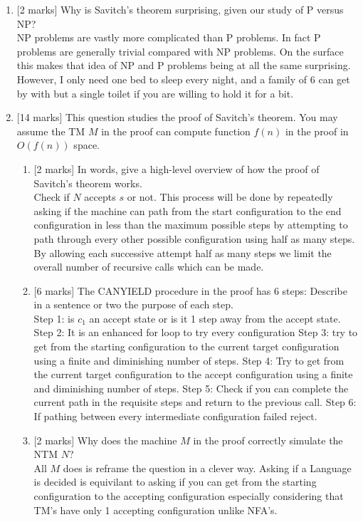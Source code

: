 \documentclass{article}
\begin{document}
\begin{enumerate}
            \item {[2 marks]} Why is Savitch's theorem surprising, given our study of P versus NP? \\
NP problems are vastly more complicated than P problems. In fact P problems are generally trivial compared with NP problems. On the surface this makes that idea of NP and P problems being at all the same surprising. However, I only need one bed to sleep every night, and a family of 6 can get by with but a single toilet if you are willing to hold it for a bit. 

            \item {[14 marks]} This question studies the proof of Savitch's theorem. You may assume the TM $M$ in the proof can compute function $f(n)$ in the proof in $O(f(n))$ space.
            \begin{enumerate}
                \item {[2 marks]} In words, give a high-level overview of how the proof of Savitch's theorem works.\\
                
Check if $N$ accepts $s$ or not. This process will be done by repeatedly asking if the machine can path from the start configuration to the end configuration in less than the maximum possible steps by attempting to path through every other possible configuration using half as many steps. By allowing each successive attempt half as many steps we limit the overall number of recursive calls which can be made.

                \item {[6 marks]} The CANYIELD procedure in the proof has 6 steps: Describe in a sentence or two the purpose of each step. \\

Step 1: is $c_1$ an accept state or is it 1 step away from the accept state.\\
Step 2: It is an enhanced for loop to try every configuration
Step 3: try to get from the starting configuration to the current target configuration using a finite and diminishing number of steps.
Step 4: Try to get from the current target configuration to the accept configuration using a finite and diminishing number of steps.
Step 5: Check if you can complete the current path in the requisite steps and return to the previous call.
Step 6: If pathing between every intermediate configuration failed reject.                
                
                \item {[2 marks]} Why does the machine $M$ in the proof correctly simulate the NTM $N$? \\
                All $M$ does is reframe the question in a clever way. Asking if a Language is decided is equivilant to asking if you can get from the starting configuration to the accepting configuration especially considering that TM's have only 1 accepting configuration unlike NFA's.
                

\end{enumerate}
\end{enumerate}
\end{document}

